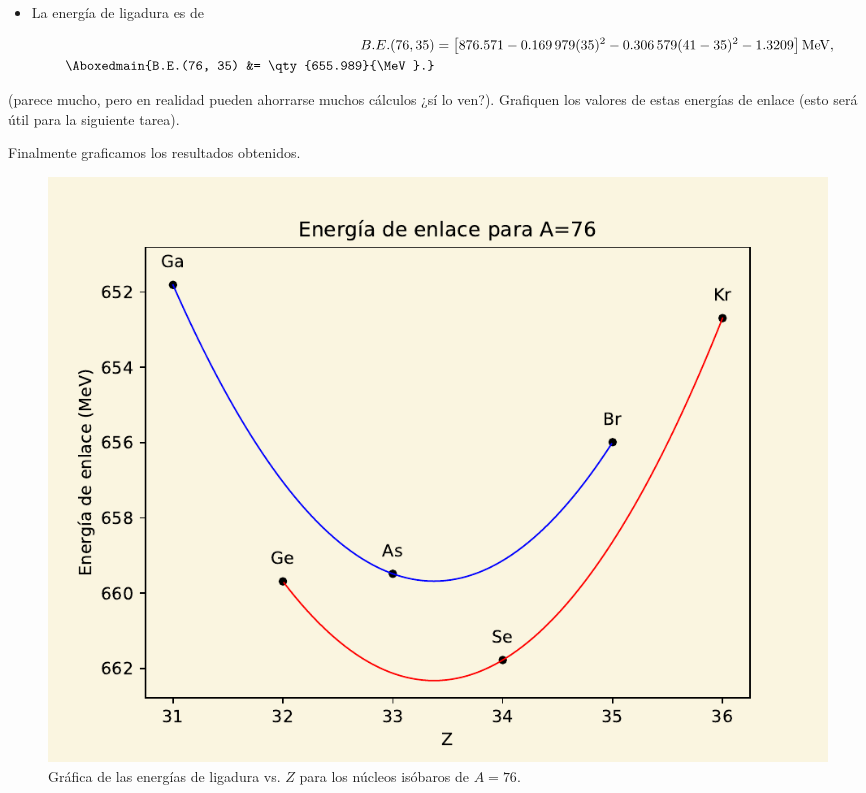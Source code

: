 \documentclass[./../main.tex]{subfiles}
\begin{document}
\begin{exercise}
\begin{solution}
\begin{itemize}
                \item {}
                
                La energía de ligadura es de

                \begin{align*}
                    B.E.(76, 35) &= \left[\num{876.571} - \num{0.169979}(35)^{2} - \num{0.306579}(41 - 35)^{2} - \num{1.3209}\right]\unit{\MeV},\\
                    \Aboxedmain{B.E.(76, 35) &= \qty{655.989}{\MeV}.}
                \end{align*}
            \end{itemize}
    
            (parece mucho, pero en realidad pueden ahorrarse muchos cálculos ¿sí lo ven?). Grafiquen los valores de estas energías de enlace (esto será útil para la siguiente tarea).

            Finalmente graficamos los resultados obtenidos.

            \begin{figure}[htb]
                \centering
                \includegraphics[scale=0.8]{binding_energy.pdf}
                \caption{Gráfica de las energías de ligadura vs. \(Z\) para los núcleos isóbaros de \(A = 76\).}
                \label{fig:}
            \end{figure}
        \end{solution}
    \end{exercise}
\end{document}
